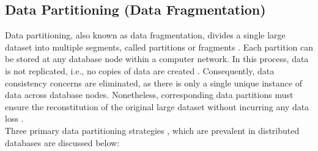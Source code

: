 \subsection{Data Partitioning (Data Fragmentation)}

Data partitioning, also known as data fragmentation, divides a single large dataset into multiple segments, called partitions or fragments \cite{mahmud2020survey}. Each partition can be stored at any database node within a computer network. In this process, data is not replicated, i.e., no copies of data are created \cite{venkateswaran2017simplified}. Consequently, data consistency concerns are eliminated, as there is only a single unique instance of data across database nodes. Nonetheless, corresponding data partitions must ensure the reconstitution of the original large dataset without incurring any data loss \cite{amiri2019sharding}.\\

\noindent Three primary data partitioning strategies \cite{ramakrishnan2003database, rahimi2010distributed, ozsu1999principles, silberschatz2011database, venkateswaran2017simplified, coronel2016database, runceanu2008fragmentation}, which are prevalent in distributed databases are discussed below:

